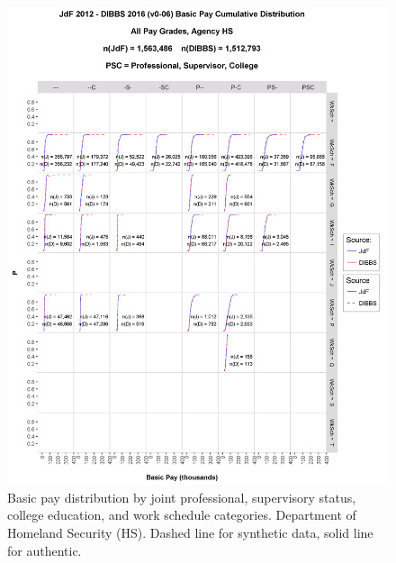 \documentclass[10pt, letterpaper]{article}
\begin{document}
\begin{spacing}{1.0}
\begin{figure}[h]
    \centering
    \includegraphics[width=6.5in, trim={0 0 1in 1.5in}, clip]{JdFDIBBSBasicPayCDFHS.png}
    \caption{Basic pay distribution by joint professional, supervisory status, college education, and work schedule  categories.  Department of Homeland Security (HS).  Dashed line for synthetic data, solid line for authentic.}
    \label{figure:JdFDIBBSBasicPayCDFHS}
\end{figure}

\clearpage


\end{spacing}
\end{document}
